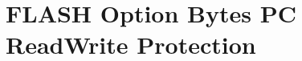 \hypertarget{group___f_l_a_s_h_ex___option___bytes___p_c___read_write___protection}{}\section{F\+L\+A\+SH Option Bytes PC Read\+Write Protection}
\label{group___f_l_a_s_h_ex___option___bytes___p_c___read_write___protection}

